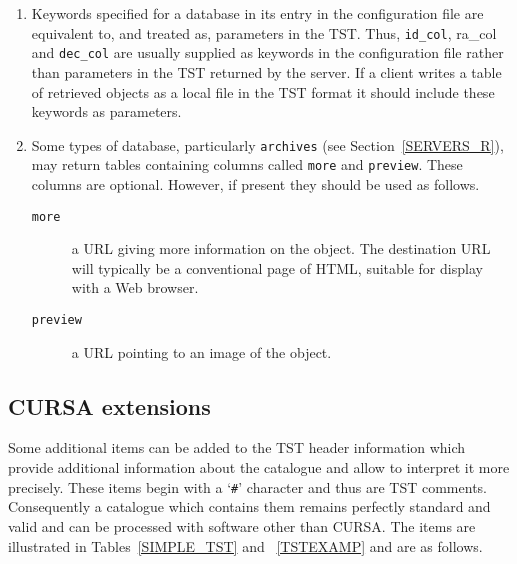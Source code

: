 \documentclass[twoside,11pt,nolof,chapters]{starlink}
\begin{document}
\begin{enumerate}

  \item Keywords specified for a database in its entry in the configuration
   file are equivalent to, and treated as, parameters in the TST.  Thus,
   \texttt{id\_col}, {ra\_col} and \texttt{dec\_col} are usually supplied as
   keywords in the configuration file rather than parameters in the TST
   returned by the server.  If a client writes a table of retrieved objects
   as a local file in the TST format it should include these keywords as
   parameters.

  \item Some types of database, particularly \texttt{archives} (see
   Section~\ref{SERVERS_R}), may return tables containing columns called
   \texttt{more} and \texttt{preview}.  These columns are optional.  However, if
   present they should be used as follows.

  \begin{description}

    \item[\texttt{more}] a URL giving more information on the object.  The
     destination URL will typically be a conventional page of HTML,
     suitable for display with a Web browser.

    \item[\texttt{preview}] a URL pointing to an image of the object.

  \end{description}

\end{enumerate}

\subsection{\label{CURSA_R}CURSA extensions}

Some additional items can be added to the TST header information which
provide additional information about the catalogue and allow
\cite{SUN190} to interpret it more precisely.
These items begin with a `\texttt{\#}' character and thus are TST comments.
Consequently a catalogue which contains them remains perfectly standard
and valid and can be processed with software other than CURSA.  The
items are illustrated in Tables~\ref{SIMPLE_TST} and ~\ref{TSTEXAMP}
and are as follows.
\end{document}
